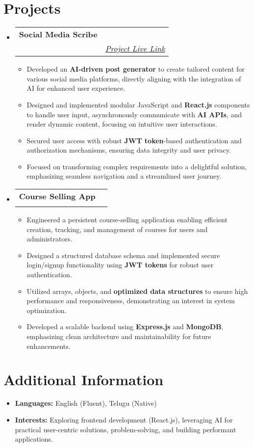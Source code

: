 \documentclass[11pt]{article}
\makeatletter
\newcommand{\resumeSubheading}[4]{
    \item
    \begin{tabular*}{0.97\textwidth}[t]{l@{\extracolsep{\fill}}r}
        \textbf{#1} & #2 \\
        \textit{\small#3} & \textit{\small #4}
    \end{tabular*}
}
\newcommand{\resumeItem}[1]{\item\small{#1}}
\newcommand{\resumeSubHeadingListStart}{\begin{itemize}[leftmargin=0.15in, label={}]}
\newcommand{\resumeSubHeadingListEnd}{\end{itemize}}
\newcommand{\resumeItemListStart}{\begin{itemize}[leftmargin=0.2in, noitemsep, topsep=2pt, parsep=0pt]}
\newcommand{\resumeItemListEnd}{\end{itemize}}
\makeatother
\begin{document}
\section*{Projects}
\resumeSubHeadingListStart
    \resumeSubheading
    {Social Media Scribe}{}
    {}
    {\href{http://grog-social-scribe.lovable.app/}{\underline{Project Live Link}}} %
    \resumeItemListStart
        \resumeItem{Developed an \textbf{AI-driven post generator} to create tailored content for various social media platforms, directly aligning with the integration of AI for enhanced user experience.}
        \resumeItem{Designed and implemented modular JavaScript and \textbf{React.js} components to handle user input, asynchronously communicate with \textbf{AI APIs}, and render dynamic content, focusing on intuitive user interactions.}
        \resumeItem{Secured user access with robust \textbf{JWT token}-based authentication and authorization mechanisms, ensuring data integrity and user privacy.}
        \resumeItem{Focused on transforming complex requirements into a delightful solution, emphasizing seamless navigation and a streamlined user journey.}
    \resumeItemListEnd

    \resumeSubheading
    {Course Selling App}{}
    {}
    {}
    \resumeItemListStart
        \resumeItem{Engineered a persistent course-selling application enabling efficient creation, tracking, and management of courses for users and administrators.}
        \resumeItem{Designed a structured database schema and implemented secure login/signup functionality using \textbf{JWT tokens} for robust user authentication.}
        \resumeItem{Utilized arrays, objects, and \textbf{optimized data structures} to ensure high performance and responsiveness, demonstrating an interest in system optimization.}
        \resumeItem{Developed a scalable backend using \textbf{Express.js} and \textbf{MongoDB}, emphasizing clean architecture and maintainability for future enhancements.}
    \resumeItemListEnd
\resumeSubHeadingListEnd

\section*{Additional Information}
\begin{itemize}[leftmargin=0.15in, label={}]
    \item \small{\textbf{Languages:} English (Fluent), Telugu (Native)}
    \item \small{\textbf{Interests:} Exploring frontend development (React.js), leveraging AI for practical user-centric solutions, problem-solving, and building performant applications.}
\end{itemize}
\end{document}
